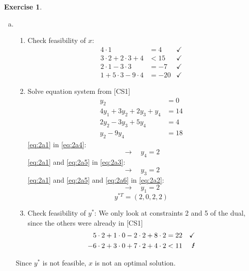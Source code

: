 \documentclass[a4paper,12pt,headsepline]{scrartcl}
\newtheorem{aufgabe}{Exercise}
\begin{document}
\begin{aufgabe}
\end{aufgabe}
\begin{enumerate}[a)]
  \item
    \begin{enumerate}[1.]
      \item Check feasibility of $x$:
        \begin{align*}
          4\cdot 1 &= 4 &\checkmark \\
          3\cdot 2 + 2\cdot 3 + 4 &< 15 &\checkmark \\
          2\cdot 1 - 3\cdot 3 &= -7 &\checkmark \\
          1 + 5\cdot 3 - 9\cdot 4 &= -20 &\checkmark
        \end{align*}
      \item Solve equation system from [CS1]
        \begin{align}
          y_2 &= 0 \label{eq:2a1}\\
          4y_1 + 3y_2 + 2y_3 + y_4 &= 14 \label{eq:2a2}\\
          2y_2 - 3y_3 + 5y_4 &= 4 \label{eq:2a3}\\
          y_2 - 9y_4 &= 18 \label{eq:2a4}
        \end{align}
        \eqref{eq:2a1} in \eqref{eq:2a4}:
        \begin{equation}\label{eq:2a5}
          \rightarrow\quad y_4=2
        \end{equation}
        \eqref{eq:2a1} and \eqref{eq:2a5} in \eqref{eq:2a3}:
        \begin{equation}\label{eq:2a6}
          \rightarrow\quad y_3=2
        \end{equation}
        \eqref{eq:2a1} and \eqref{eq:2a5} and \eqref{eq:2a6} in \eqref{eq:2a2}:
        \begin{equation}
          \rightarrow\quad y_1=2
        \end{equation}
        \[ y^{*T} = (2,0,2,2) \]
      \item Check feasibility of $y^*$: We only look at constraints 2 and 5 of the dual, since the others were already in [CS1]
        \begin{align*}
          5\cdot 2 + 1\cdot 0 - 2\cdot 2 + 8\cdot 2 &= 22 &\checkmark \\
          -6\cdot 2 + 3\cdot 0 + 7\cdot 2 + 4\cdot 2 &< 11 &\text{\Lightning}
        \end{align*}
    \end{enumerate}
    Since $y^*$ is not feasible, $x$ is not an optimal solution.

\end{enumerate}
\end{document}

